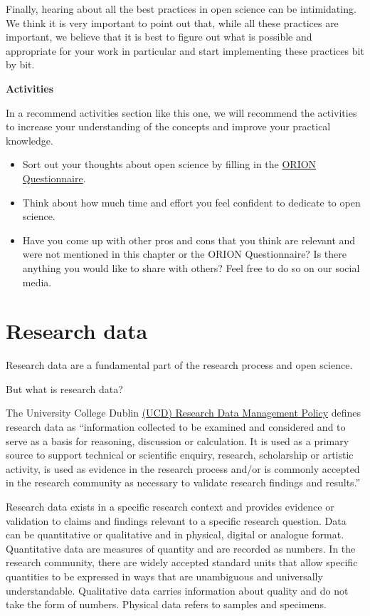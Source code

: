 \documentclass[
]{book}
\begin{document}
Finally, hearing about all the best practices in open science can be intimidating. We think it is very important to point out that, while all these practices are important, we believe that it is best to figure out what is possible and appropriate for your work in particular and start implementing these practices bit by bit.

\textbf{Activities}

In a recommend activities section like this one, we will recommend the activities to increase your understanding of the concepts and improve your practical knowledge.

\begin{itemize}
\item
  Sort out your thoughts about open science by filling in the \href{https://www.orion-openscience.eu/public/2019-01/ORION_Questionaire_RPFO-CRECIM.pdf}{ORION Questionnaire}.
\item
  Think about how much time and effort you feel confident to dedicate to open science.
\item
  Have you come up with other pros and cons that you think are relevant and were not mentioned in this chapter or the ORION Questionnaire? Is there anything you would like to share with others? Feel free to do so on our social media.
\end{itemize}

\hypertarget{research-data}{%
\chapter{Research data}\label{research-data}}

Research data are a fundamental part of the research process and open science.

But what is research data?

The University College Dublin \href{https://hub.ucd.ie/usis/!W_HU_MENU.P_PUBLISH?p_tag=GD-DOCLAND\&ID=227}{(UCD) Research Data Management Policy} defines research data as ``information collected to be examined and considered and to serve as a basis for reasoning, discussion or calculation. It is used as a primary source to support technical or scientific enquiry, research, scholarship or artistic activity, is used as evidence in the research process and/or is commonly accepted in the research community as necessary to validate research findings and results.''

Research data exists in a specific research context and provides evidence or validation to claims and findings relevant to a specific research question. Data can be quantitative or qualitative and in physical, digital or analogue format. Quantitative data are measures of quantity and are recorded as numbers. In the research community, there are widely accepted standard units that allow specific quantities to be expressed in ways that are unambiguous and universally understandable. Qualitative data carries information about quality and do not take the form of numbers. Physical data refers to samples and specimens.
\end{document}
